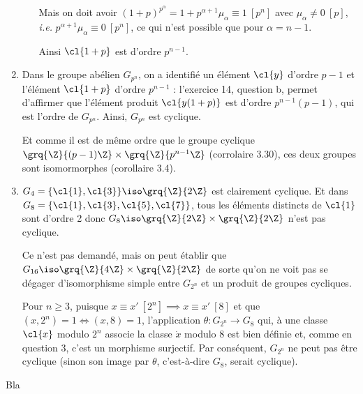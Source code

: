 \begin{enumerate}
\begin{enumerate}
Mais on doit avoir $(1+p)^{p^{\alpha}} = 1 + p^{\alpha+1}\mu_{\alpha} \equiv 1~ [p^n]$ avec $\mu_{\alpha}\neq 0~ [p]$, \textit{i.e.} $p^{\alpha+1}\mu_{\alpha} \equiv 0~ [p^n]$, ce qui n'est possible que pour $\alpha = n-1$.

Ainsi $\cl{1+p}$ est d'ordre $p^{n-1}$.

      \end{enumerate}

\item Dans le groupe abélien $G_{p^n}$, on a identifié un élément $\cl{y}$ d'ordre $p-1$ et l'élément $\cl{1+p}$ d'ordre $p^{n-1}$ : l'exercice 14, question b, permet d'affirmer que l'élément produit $\cl{y (1+p)}$ est d'ordre $p^{n-1}(p-1)$, qui est l'ordre de $G_{p^n}$. Ainsi, $G_{p^n}$ est cyclique.

Et comme il est de même ordre que le groupe cyclique $\grq{\Z}{(p-1)\Z}\times \grq{\Z}{p^{n-1}\Z}$ (corrolaire 3.30), ces deux groupes sont isomormorphes (corollaire 3.4).

\item $G_4 =\{\cl{1},\cl{3}\} \iso \grq{\Z}{2\Z}$ est clairement cyclique. Et dans $G_8 =\{\cl{1},\cl{3},\cl{5},\cl{7}\}$, tous les éléments distincts de $\cl{1}$ sont d'ordre 2 donc $G_8\iso \grq{\Z}{2\Z}\times \grq{\Z}{2\Z}$ n'est pas cyclique.

Ce n'est pas demandé, mais on peut établir que $G_{16}\iso \grq{\Z}{4\Z}\times \grq{\Z}{2\Z}$ de sorte qu'on ne voit pas se dégager d'isomorphisme simple entre $G_{2^n}$ et un produit de groupes cycliques.

Pour $n\geqslant 3$, puisque $x\equiv x'~ [2^n] \implies x\equiv x'~ [8]$ et que $(x,2^n) = 1 \iff (x,8)=1$, l'application $\theta\colon G_{2^n} \to G_8$ qui, à une classe $\cl{x}$ modulo $2^n$ associe la classe $\dot{x}$ modulo 8 est bien définie et, comme en question 3, c'est un morphisme surjectif. Par conséquent, $G_{2^n}$ ne peut pas être cyclique (sinon son image par $\theta$, c'est-à-dire $G_8$, serait cyclique).
\end{enumerate}

Bla

